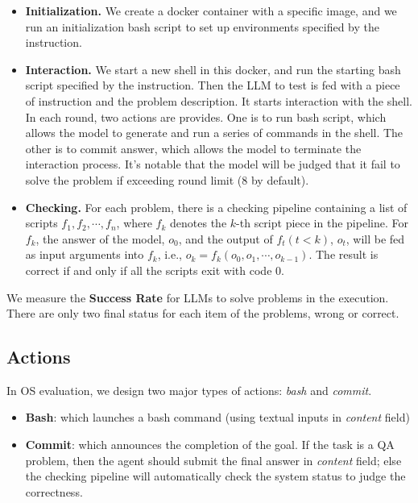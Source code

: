 \begin{itemize}[leftmargin=1.5em,itemsep=0pt,parsep=0.2em,topsep=0.0em,partopsep=0.0em]
    \item \textbf{Initialization.} We create a docker container with a specific image, and we run an initialization bash script to set up environments specified by the instruction.
    \item \textbf{Interaction.} We start a new shell in this docker, and run the starting bash script specified by the instruction. 
    Then the LLM to test is fed with a piece of instruction and the problem description. 
    It starts interaction with the shell. 
    In each round, two actions are provides. 
    One is to run bash script, which allows the model to generate and run a series of commands in the shell. 
    The other is to commit answer, which allows the model to terminate the interaction process. 
    It's notable that the model will be judged that it fail to solve the problem if exceeding round limit (8 by default).
    \item \textbf{Checking.} For each problem, there is a checking pipeline containing a list of scripts $f_1, f_2, \cdots, f_n$, where $f_k$ denotes the $k$-th script piece in the pipeline. 
    For $f_k$, the answer of the model, $o_0$, and the output of $f_t(t< k)$, $o_t$, will be fed as input arguments into $f_k$, i.e., $o_k=f_k(o_0, o_1, \cdots, o_{k-1})$. 
    The result is correct if and only if all the scripts exit with code $0$.
\end{itemize}

We measure the \textbf{Success Rate} for LLMs to solve problems in the execution. There are only two final status for each item of the problems, wrong or correct.


\subsection{Actions}
In OS evaluation, we design two major types of actions: \textit{bash} and \textit{commit}.

\begin{itemize}[leftmargin=1.5em,itemsep=0pt,parsep=0.2em,topsep=0.0em,partopsep=0.0em]
    \item \textbf{Bash}: which launches a bash command (using textual inputs in \textit{content} field)
    \item \textbf{Commit}: which announces the completion of the goal. If the task is a QA problem, then the agent should submit the final answer in \textit{content} field; else the checking pipeline will automatically check the system status to judge the correctness.
\end{itemize}

